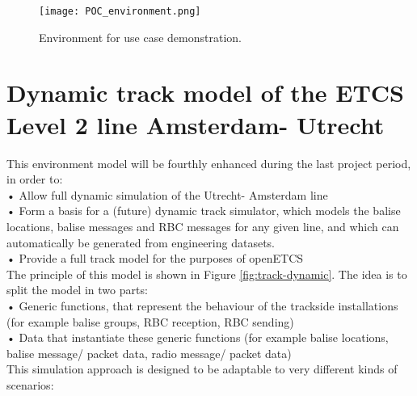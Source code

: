 	
\begin{figure}
  \centering
  \texttt{[image: POC\_environment.png]}
  \caption{Environment for use case demonstration.}
  \label{fig:WP3-demo}
\end{figure}




\section{Dynamic track model of the ETCS Level 2 line Amsterdam- Utrecht}

This environment model will be fourthly enhanced during the last project period, in order to:\\

•   Allow full dynamic simulation of the Utrecht- Amsterdam line\\
•   Form a basis for a (future) dynamic track simulator, which models the balise locations, balise messages and RBC messages for any given line, and which can automatically be generated from engineering datasets.\\
•   Provide a full track model for the purposes of openETCS\\

The principle of this model is shown in Figure \ref{fig:track-dynamic}. 
The idea is to split the model in two parts:\\
•  	Generic functions, that represent the behaviour of the trackside installations (for example balise groups, RBC reception, RBC sending)\\
•  	Data that instantiate these generic functions (for example balise locations, balise message/ packet data, radio message/ packet data)\\

This simulation approach is designed to be adaptable to very different kinds of scenarios:\\

